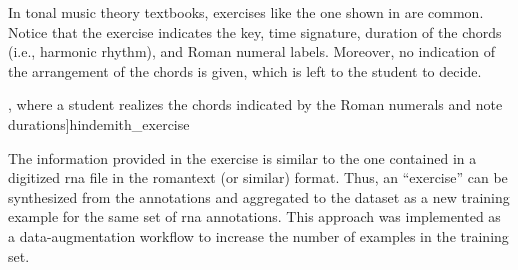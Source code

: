 
In tonal music theory textbooks, exercises like the one
shown in  are common. Notice that
the exercise indicates the key, time signature, duration of
the chords (i.e., harmonic rhythm), and Roman numeral
labels. Moreover, no indication of the arrangement of the
chords is given, which is left to the student to decide. 

\phdfigure[Harmony exercise in
\textcite[7]{hindemith1943concentrated}, where a student
\glspl{realize} the chords indicated by the Roman numerals
and note durations]{hindemith_exercise}

The information provided in the exercise is similar to the
one contained in a digitized \gls{rna} file in the
\gls{romantext} (or similar) format. Thus, an ``exercise''
can be synthesized from the annotations and aggregated to
the dataset as a new training example for the same set of
\gls{rna} annotations. This approach was implemented as a
data-augmentation workflow to increase the number of
examples in the training set.
